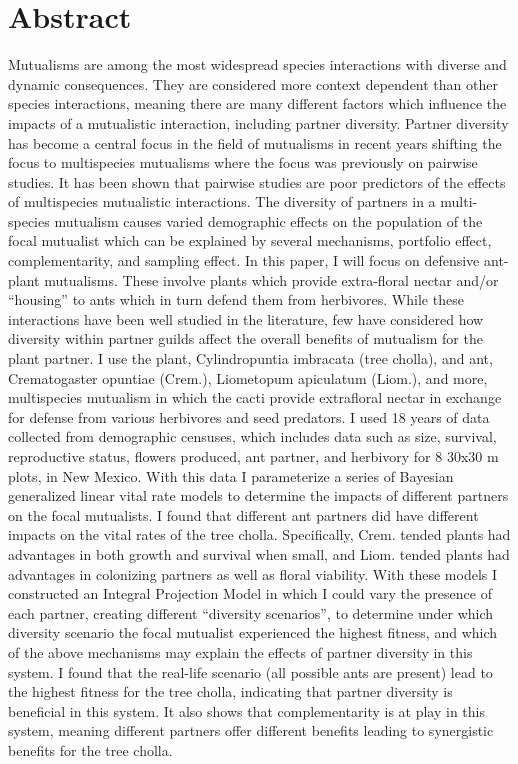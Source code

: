 \documentclass[11pt]{article}\usepackage[sc]{mathpazo} %
\begin{document}
\section*{Abstract}  
  Mutualisms are among the most widespread species interactions with diverse and dynamic consequences. They are considered more context dependent than other species interactions, meaning there are many different factors which influence the impacts of a mutualistic interaction, including partner diversity. Partner diversity has become a central focus in the field of mutualisms in recent years shifting the focus to multispecies mutualisms where the focus was previously on pairwise studies. It has been shown that pairwise studies are poor predictors of the effects of multispecies mutualistic interactions. The diversity of partners in a multi-species mutualism causes varied demographic effects on the population of the focal mutualist which can be explained by several mechanisms, portfolio effect, complementarity, and sampling effect. In this paper, I will focus on defensive ant-plant mutualisms. These involve plants which provide extra-floral nectar and/or “housing” to ants which in turn defend them from herbivores. While these interactions have been well studied in the literature, few have considered how diversity within partner guilds affect the overall benefits of mutualism for the plant partner.   
  I use the plant, Cylindropuntia imbracata (tree cholla), and ant, Crematogaster opuntiae (Crem.), Liometopum apiculatum (Liom.), and more, multispecies mutualism in which the cacti provide extrafloral nectar in exchange for defense from various herbivores and seed predators. I used 18 years of data collected from demographic censuses, which includes data such as size, survival, reproductive status, flowers produced, ant partner, and herbivory for 8 30x30 m plots, in New Mexico. With this data I parameterize a series of Bayesian generalized linear vital rate models to determine the impacts of different partners on the focal mutualists. I found that different ant partners did have different impacts on the vital rates of the tree cholla. Specifically, Crem. tended plants had advantages in both growth and survival when small, and Liom. tended plants had advantages in colonizing partners as well as floral viability. With these models I constructed an Integral Projection Model in which I could vary the presence of each partner, creating different “diversity scenarios”, to determine under which diversity scenario the focal mutualist experienced the highest fitness, and which of the above mechanisms may explain the effects of partner diversity in this system. I found that the real-life scenario (all possible ants are present) lead to the highest fitness for the tree cholla, indicating that partner diversity is beneficial in this system. It also shows that complementarity is at play in this system, meaning different partners offer different benefits leading to synergistic benefits for the tree cholla. 
\end{document}
